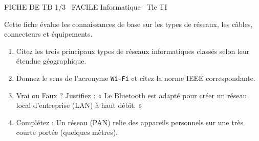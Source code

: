 \documentclass[11pt]{article}
\begin{document}
\begin{tcolorbox}[enhanced,colback=popink,colframe=popink,arc=10pt,boxrule=0pt,left=12pt,right=12pt,top=9pt,bottom=9pt]
{\color{white}\popxbold\small FICHE DE TD 1/3 \textbullet\ FACILE \hfill Informatique \textbullet\ Tle TI\par}
\end{tcolorbox}
\vspace{4pt}
Cette fiche évalue les connaissances de base sur les types de réseaux, les câbles, connecteurs et équipements.

\begin{exercice}
\begin{enumerate}
    \item Citez les trois principaux types de réseaux informatiques classés selon leur étendue géographique.
    \item Donnez le sens de l'acronyme \texttt{Wi-Fi} et citez la norme IEEE correspondante.
    \item Vrai ou Faux ? Justifiez : « Le Bluetooth est adapté pour créer un réseau local d'entreprise (LAN) à haut débit. »
    \item Complétez : Un réseau \underline{\hspace{4cm}} (PAN) relie des appareils personnels sur une très courte portée (quelques mètres).
\end{enumerate}
\end{exercice}
\end{document}
